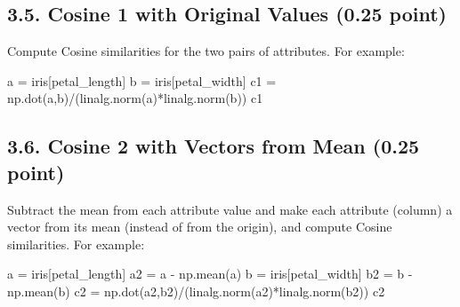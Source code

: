 \documentclass[
  letterpaper,
]{scrbook}
\newenvironment{Shaded}{\begin{snugshade}}{\end{snugshade}}
\newcommand{\NormalTok}[1]{\textcolor[rgb]{0.00,0.23,0.31}{#1}}
\newcommand{\OperatorTok}[1]{\textcolor[rgb]{0.37,0.37,0.37}{#1}}
\newcommand{\StringTok}[1]{\textcolor[rgb]{0.13,0.47,0.30}{#1}}
\begin{document}
\subsection*{3.5. Cosine 1 with Original Values (0.25
point)}\label{cosine-1-with-original-values-0.25-point}

Compute Cosine similarities for the two pairs of attributes. For
example:

\begin{Shaded}
\begin{Highlighting}[]
\NormalTok{a }\OperatorTok{=}\NormalTok{ iris[}\StringTok{\textquotesingle{}petal\_length\textquotesingle{}}\NormalTok{]}
\NormalTok{b }\OperatorTok{=}\NormalTok{ iris[}\StringTok{\textquotesingle{}petal\_width\textquotesingle{}}\NormalTok{]}
\NormalTok{c1 }\OperatorTok{=}\NormalTok{ np.dot(a,b)}\OperatorTok{/}\NormalTok{(linalg.norm(a)}\OperatorTok{*}\NormalTok{linalg.norm(b))}
\NormalTok{c1}
\end{Highlighting}
\end{Shaded}

\subsection*{3.6. Cosine 2 with Vectors from Mean (0.25
point)}\label{cosine-2-with-vectors-from-mean-0.25-point}

Subtract the mean from each attribute value and make each attribute
(column) a vector from its mean (instead of from the origin), and
compute Cosine similarities. For example:

\begin{Shaded}
\begin{Highlighting}[]
\NormalTok{a }\OperatorTok{=}\NormalTok{ iris[}\StringTok{\textquotesingle{}petal\_length\textquotesingle{}}\NormalTok{]}
\NormalTok{a2 }\OperatorTok{=}\NormalTok{ a }\OperatorTok{{-}}\NormalTok{ np.mean(a)}
\NormalTok{b }\OperatorTok{=}\NormalTok{ iris[}\StringTok{\textquotesingle{}petal\_width\textquotesingle{}}\NormalTok{]}
\NormalTok{b2 }\OperatorTok{=}\NormalTok{ b }\OperatorTok{{-}}\NormalTok{ np.mean(b)}
\NormalTok{c2 }\OperatorTok{=}\NormalTok{ np.dot(a2,b2)}\OperatorTok{/}\NormalTok{(linalg.norm(a2)}\OperatorTok{*}\NormalTok{linalg.norm(b2))}
\NormalTok{c2}
\end{Highlighting}
\end{Shaded}
\end{document}
